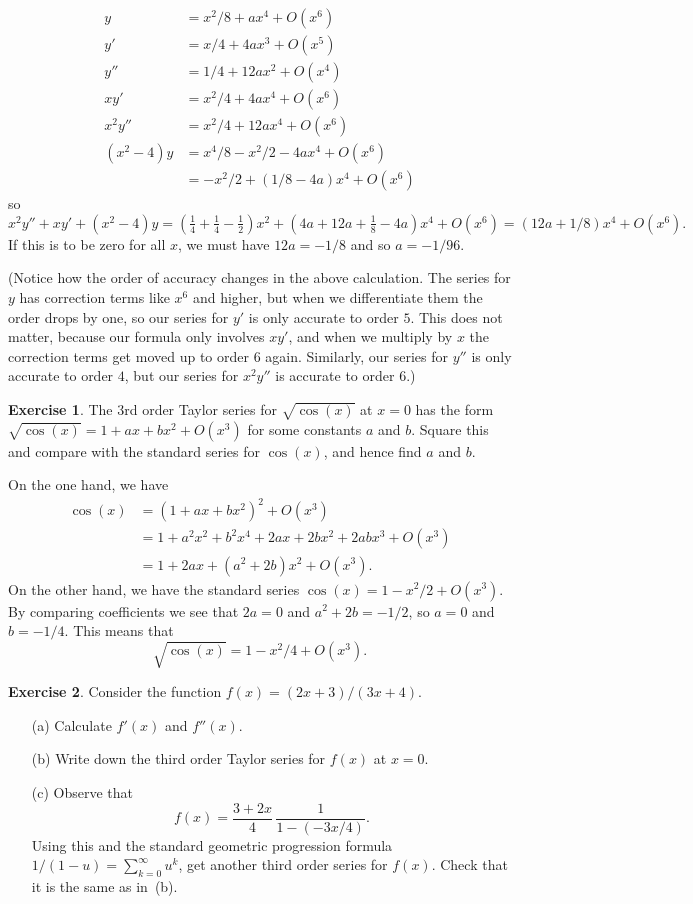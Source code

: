 \documentclass[a4paper]{amsart}
\theoremstyle{definition}
\newtheorem{exercise}{Exercise}[section]
\newenvironment{solution}{{\noindent \bf Solution:}}{}
\begin{document}
\begin{solution}
\begin{align*}
  y   &= x^2/8 + ax^4 + O(x^6) \\
  y'  &= x/4 + 4ax^3 + O(x^5) \\
  y'' &= 1/4 + 12ax^2 + O(x^4) \\
  xy' &= x^2/4 + 4ax^4 + O(x^6) \\
  x^2y'' &= x^2/4 + 12ax^4 + O(x^6) \\
  (x^2-4)y &= x^4/8 - x^2/2 - 4ax^4 + O(x^6) \\
           &= -x^2/2 + (1/8-4a)x^4 + O(x^6) 
 \end{align*}
 so
 \[ x^2y'' + xy' + (x^2-4)y =
    (\tfrac{1}{4} + \tfrac{1}{4} - \tfrac{1}{2}) x^2 +
    (4a+12a+\tfrac{1}{8}-4a)x^4 + O(x^6) = 
    (12a+1/8)x^4 + O(x^6).
 \]
 If this is to be zero for all $x$, we must have $12a=-1/8$
 and so $a=-1/96$.

 (Notice how the order of accuracy changes in the above
 calculation.  The series for $y$ has correction terms like
 $x^6$ and higher, but when we differentiate them the order
 drops by one, so our series for $y'$ is only accurate to
 order $5$.  This does not matter, because our formula only
 involves $xy'$, and when we multiply by $x$ the correction
 terms get moved up to order $6$ again.  Similarly, our
 series for $y''$ is only accurate to order $4$, but our
 series for $x^2y''$ is accurate to order $6$.)
\end{solution}
\begin{exercise}\label{ex-taylor-root-cos}
The $3$rd order Taylor series for $\sqrt{\cos(x)}$ at $x=0$ has the
 form $\sqrt{\cos(x)}=1+ax+bx^2+O(x^3)$ for some constants
 $a$ and $b$.  Square this and compare with the standard
 series for $\cos(x)$, and hence find $a$ and $b$.
\end{exercise}
\begin{solution}
On the one hand, we have
 \begin{align*}
  \cos(x) &= (1+ax+bx^2)^2 + O(x^3) \\
   &= 1 + a^2x^2 + b^2x^4 + 2ax + 2bx^2 + 2abx^3 + O(x^3) \\
   &= 1 + 2ax + (a^2+2b)x^2 + O(x^3).
 \end{align*}
 On the other hand, we have the standard series
 $\cos(x)=1-x^2/2+O(x^3)$.  By comparing coefficients we see
 that $2a=0$ and $a^2+2b=-1/2$, so $a=0$ and $b=-1/4$.  This
 means that
 \[ \sqrt{\cos(x)} = 1 - x^2/4 + O(x^3). \]
\end{solution}
\begin{exercise}\label{ex-taylor-mobius}
Consider the function $f(x)=(2x+3)/(3x+4)$.
 \begin{itemize}
  \item[(a)] Calculate $f'(x)$ and $f''(x)$.
  \item[(b)] Write down the third order Taylor series for
   $f(x)$ at $x=0$. 
  \item[(c)] Observe that
   \[ f(x) = \frac{3+2x}{4} \, \frac{1}{1 - (-3x/4)}. \]
   Using this and the standard geometric progression formula
   $1/(1-u)=\sum_{k=0}^\infty u^k$, get another third order
   series for $f(x)$.  Check that it is the same as in~(b).
 \end{itemize}
\end{exercise}
\end{document}
